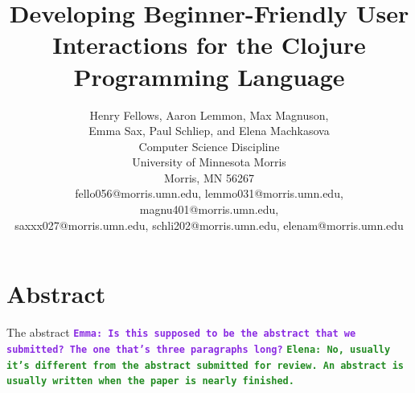 \documentclass[12pt]{article}
\newcommand{\comment}[1]{{\bf \tt  {#1}}}
\newcommand{\emcomment}[1]{\textcolor{ForestGreen}{\comment{Elena: {#1}}}}
\newcommand{\escomment}[1]{\textcolor{BlueViolet}{\comment{Emma: {#1}}}}
\newcommand{\alcomment}[1]{\textcolor{red}{\comment{Lemmon: {#1}}}}
\begin{document}
\pagestyle{plain}
%

\title{Developing Beginner-Friendly User Interactions for the Clojure Programming Language}
%
%

\author{
Henry Fellows, Aaron Lemmon, Max Magnuson, \\
	Emma Sax, Paul Schliep, and Elena Machkasova \\
Computer Science Discipline \\
University of Minnesota Morris\\
Morris, MN 56267\\
fello056@morris.umn.edu, lemmo031@morris.umn.edu, magnu401@morris.umn.edu, \\
	saxxx027@morris.umn.edu, schli202@morris.umn.edu, elenam@morris.umn.edu
}
\date{}
\maketitle
\thispagestyle{empty}

\section*{\centering Abstract}
The abstract
\escomment{Is this supposed to be the abstract that we submitted? The
  one that's three paragraphs long?}
\emcomment{No, usually it's different from the abstract submitted for
  review. An abstract is usually written when the paper is nearly
  finished.}

\newpage
\setcounter{page}{1}
\end{document}
